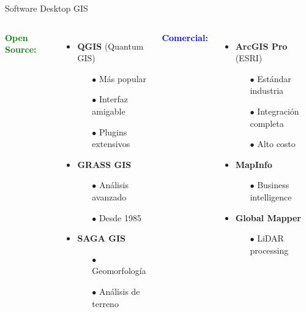 \documentclass[10pt]{beamer}
\begin{document}
\begin{frame}{Software Desktop GIS}
    \begin{columns}
        \textbf{\textcolor{green}{Open Source:}}
        \begin{itemize}
            \item \textbf{QGIS} (Quantum GIS)
                \begin{itemize}
                    \item[$\bullet$] Más popular
                    \item[$\bullet$] Interfaz amigable
                    \item[$\bullet$] Plugins extensivos
                \end{itemize}
            \item \textbf{GRASS GIS}
                \begin{itemize}
                    \item[$\bullet$] Análisis avanzado
                    \item[$\bullet$] Desde 1985
                \end{itemize}
            \item \textbf{SAGA GIS}
                \begin{itemize}
                    \item[$\bullet$] Geomorfología
                    \item[$\bullet$] Análisis de terreno
                \end{itemize}
        \end{itemize}
        
        \textbf{\textcolor{blue}{Comercial:}}
        \begin{itemize}
            \item \textbf{ArcGIS Pro} (ESRI)
                \begin{itemize}
                    \item[$\bullet$] Estándar industria
                    \item[$\bullet$] Integración completa
                    \item[$\bullet$] Alto costo
                \end{itemize}
            \item \textbf{MapInfo}
                \begin{itemize}
                    \item[$\bullet$] Business intelligence
                \end{itemize}
            \item \textbf{Global Mapper}
                \begin{itemize}
                    \item[$\bullet$] LiDAR processing
                \end{itemize}
        \end{itemize}
    \end{columns}
    

\end{frame}
\end{document}
